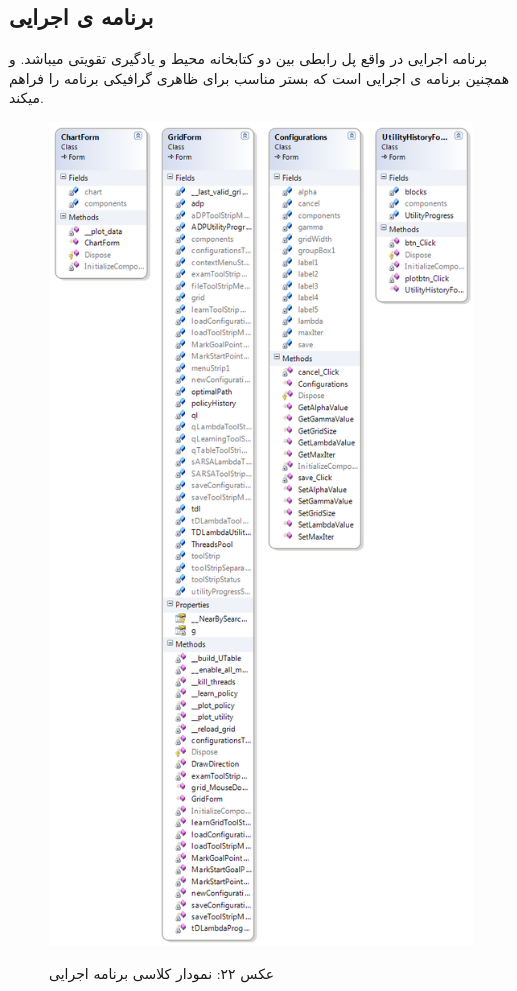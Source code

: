 \documentclass[10pt,a4paper]{article}
\begin{document}
\begin{Arabic}
\subsection{\textarabic{برنامه ی اجرایی}}
برنامه اجرایی در واقع پل رابطی بین دو کتابخانه محیط و یادگیری تقویتی میباشد. و همچنین برنامه ی اجرایی است که بستر مناسب برای ظاهری گرافیکی برنامه را فراهم میکند.
\begin{figure}[H]
    \centering
    \includegraphics[width=.75\textwidth]{diag-form}
    \begin{center}
    \textarabic{عکس ۲۲: نمودار کلاسی برنامه اجرایی}
    \end{center}
\end{figure}
\end{Arabic}
\end{document}

